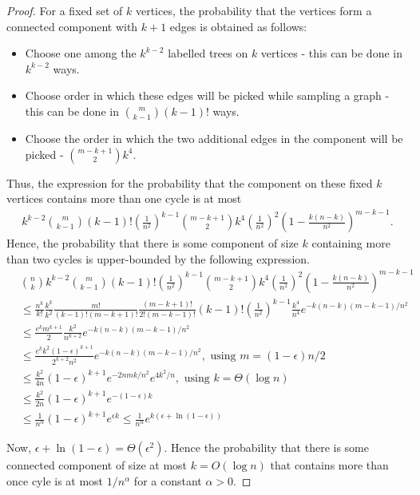 \begin{proof}
  For a fixed set of $k$ vertices, the probability that the vertices form a
  connected component with $k+1$ edges is obtained as follows:
  \begin{itemize}
  \item Choose one among the $k^{k-2}$ labelled trees on $k$ vertices - this can
    be done in $k^{k-2}$ ways.
  \item Choose order in which these edges will be picked while sampling a graph
    - this can be done in $\binom{m}{k-1} (k-1)!$ ways.
  \item Choose the order in which the two additional edges in the component will
    be picked - $\binom{m-k+1}{2} k^4$.
  \end{itemize}
  Thus, the expression for the probability that the
  component on these fixed $k$ vertices contains more than one cycle is at most
  \begin{align*}
    k^{k-2} \binom{m}{k-1} (k-1)! \left( \frac{1}{n^2} \right)^{k-1} \binom{m-k+1}{2} k^4 \left( \frac{1}{n^2} \right)^2 \left(1 - \frac{k(n-k)}{n^2} \right)^{m-k-1}.
  \end{align*}
  Hence, the probability that there is some component of size $k$ containing more
  than two cycles is upper-bounded by the following expression.
  \begin{align*}
    &\binom{n}{k}k^{k-2} \binom{m}{k-1} (k-1)! \left( \frac{1}{n^2} \right)^{k-1} \binom{m-k+1}{2} k^4 \left( \frac{1}{n^2} \right)^2 \left(1 - \frac{k(n-k)}{n^2} \right)^{m-k-1}\\
    &\leq \frac{n^k}{k!} \frac{k^k}{k^2} \frac{m!}{(k-1)!(m-k+1)!} \frac{(m-k+1)!}{2! (m-k-1)!} (k-1)! \left(\frac{1}{n^2} \right)^{k-1} \frac{k^4}{n^4} e^{-k(n-k)(m-k-1)/n^2}\\
    &\leq \frac{e^k m^{k+1}}{2} \frac{k^2}{n^{k+2}}e^{-k(n-k)(m-k-1)/n^2}\\
    &\leq \frac{e^kk^2(1-\epsilon)^{k+1}}{2^{k+2}n^2}e^{-k(n-k)(m-k-1)/n^2}, \text{ using $m=(1-\epsilon)n/2$}\\
    &\leq \frac{k^2}{4n}(1-\epsilon)^{k+1}e^{-2nmk/n^2}e^{4k^2/n}, \text{ using $k=\Theta(\log n)$}\\
    &\leq \frac{k^2}{2n}(1-\epsilon)^{k+1}e^{-(1-\epsilon)k}\\
    &\leq \frac{1}{n^\alpha}(1-\epsilon)^{k+1}e^{\epsilon k} \leq \frac{1}{n^\alpha} e^{k(\epsilon + \ln(1-\epsilon))}
  \end{align*}

  Now, $\epsilon+\ln(1-\epsilon) = \Theta(\epsilon^2)$. Hence the probability that there is some connected component of size at most $k = O(\log n)$ that contains more than once cyle is at most $1/n^\alpha$ for a constant $\alpha > 0$.
\end{proof}


